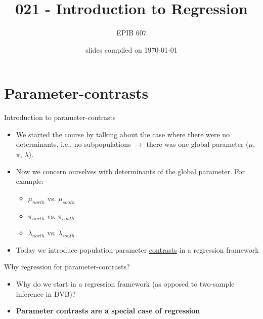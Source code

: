 \documentclass[10pt]{beamer}\usepackage[]{graphicx}\usepackage[]{color}
\begin{document}
	
	
	


	\title{021 - Introduction to Regression}
\author{EPIB 607}

\date{slides compiled on \today}

\maketitle


\section{Parameter-contrasts}

\begin{frame}{Introduction to parameter-contrasts}
	
	\begin{itemize}
		\setlength\itemsep{2em}
		\item We started the course by talking about the case where there were no determinants, i.e., no subpopulations $\to$ there was one global parameter ($\mu$, $\pi$, $\lambda$). \pause 
		\item Now we concern ourselves with determinants of the global parameter. For example:
		\begin{itemize}
			\item $\mu_{north}$ vs. $\mu_{south}$
			\item $\pi_{north}$ vs. $\pi_{south}$
			\item $\lambda_{north}$ vs. $\lambda_{south}$
		\end{itemize}
		
		\item Today we introduce population parameter \underline{contrasts} in a regression framework
		
	\end{itemize}
	
\end{frame}


\begin{frame}{Why regression for parameter-contrasts?}
	
	\begin{itemize}
		\setlength\itemsep{1.5em}
		\item Why do we start in a regression framework (as opposed to two-sample inference in DVB)?  
		\item \textbf{Parameter contrasts are a special case of regression}  
	\end{itemize}
	
\end{frame}
\end{document}
